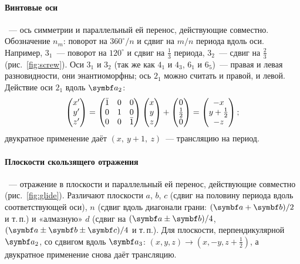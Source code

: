 \paragraph{Винтовые оси}
~— ось симметрии и параллельный ей перенос,
действующие совместно. Обозначение $n_m$: поворот на $360^\circ/n$ и сдвиг на
$m/n$ периода вдоль оси. Например, $3_1$~— поворот на $120^\circ$ и сдвиг на
$\frac13$ периода, $3_2$~— сдвиг на $\frac23$ (рис.~\ref{fig:screw}). Оси $3_1$ и $3_2$
(так же как $4_1$ и $4_3$, $6_1$ и $6_5$)~— правая и левая разновидности, они
энантиоморфны; ось $2_1$ можно считать и правой, и левой. Действие оси
$2_1$ вдоль $\vb a_2$:
\[
\begin{pmatrix}x'\\y'\\z'\end{pmatrix}=
\begin{pmatrix}\bar{1}&0&0\\0&1&0\\0&0&\bar{1}\end{pmatrix}\begin{pmatrix}x\\y\\z\end{pmatrix}+
\begin{pmatrix}0\\\frac12\\0\end{pmatrix}=\begin{pmatrix}-x\\y+\frac12\\-z\end{pmatrix};
\]
двукратное применение даёт $(x,\ y+1,\ z)$~— трансляцию на период.

\paragraph{Плоскости скользящего отражения}
~— отражение в плоскости и
параллельный ей перенос, действующие совместно (рис.~\ref{fig:glide}).
Различают плоскости $a$, $b$, $c$ (сдвиг на половину периода вдоль
соответствующей оси), $n$ (сдвиг вдоль диагонали грани:
$(\vb a+\vb b)/2$ и т.\,п.) и «алмазную» $d$ (сдвиг на $(\vb a\pm\vb b)/4$,
$(\vb a\pm\vb b\pm\vb c)/4$ и т.\,п.). Для плоскости, перпендикулярной $\vb a_2$, со
сдвигом вдоль $\vb a_3$: $(x,y,z)\to(x,-y,z+\frac12)$, а двукратное применение
снова даёт трансляцию.

